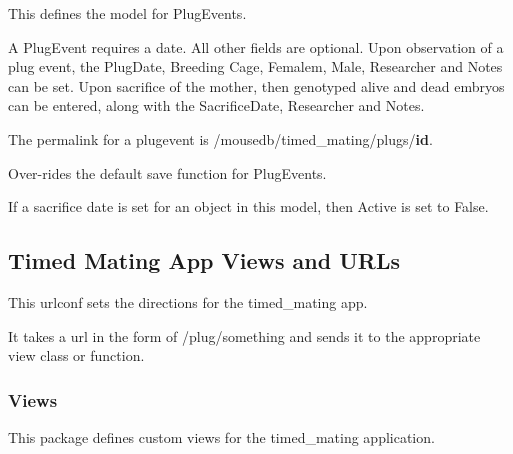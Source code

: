 \documentclass[letterpaper,10pt,english]{sphinxmanual}
\begin{document}
\begin{fulllineitems}
\label{timed_mating:mousedb.timed_mating.models.PlugEvents}
This defines the model for PlugEvents.

A PlugEvent requires a date.  All other fields are optional.
Upon observation of a plug event, the PlugDate, Breeding Cage, Femalem, Male, Researcher and Notes can be set.
Upon sacrifice of the mother, then genotyped alive and dead embryos can be entered, along with the SacrificeDate, Researcher and Notes.

\begin{fulllineitems}
\label{timed_mating:mousedb.timed_mating.models.PlugEvents.get_absolute_url}
The permalink for a plugevent is /mousedb/timed\_mating/plugs/\textbf{id}.

\end{fulllineitems}


\begin{fulllineitems}
\label{timed_mating:mousedb.timed_mating.models.PlugEvents.save}
Over-rides the default save function for PlugEvents.

If a sacrifice date is set for an object in this model, then Active is set to False.

\end{fulllineitems}


\end{fulllineitems}



\subsection{Timed Mating App Views and URLs}
\label{timed_mating:timed-mating-app-views-and-urls}\label{timed_mating:module-mousedb.timed_mating.urls}
This urlconf sets the directions for the timed\_mating app.

It takes a url in the form of /plug/something and sends it to the appropriate view class or function.


\subsubsection{Views}
\label{timed_mating:module-mousedb.timed_mating.views}\label{timed_mating:views}
This package defines custom views for the timed\_mating application.
\end{document}
